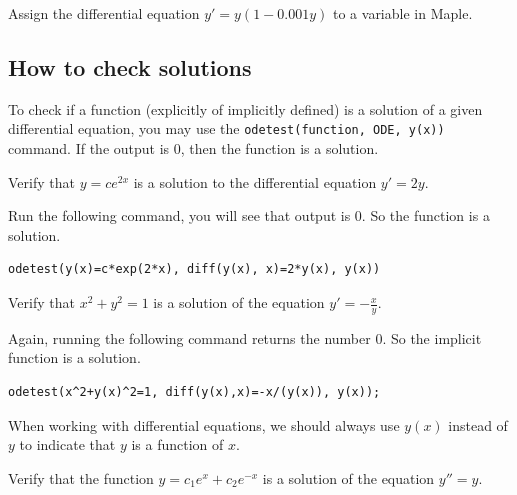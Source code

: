 \documentclass[
  12pt]{elegantbook}
\begin{document}
\begin{exercise}
Assign the differential equation \(y'=y(1-0.001y)\) to a variable in Maple.
\end{exercise}

\hypertarget{how-to-check-solutions}{%
\subsection{How to check solutions}\label{how-to-check-solutions}}

To check if a function (explicitly of implicitly defined) is a solution of a given differential equation, you may use the \texttt{odetest(function,\ ODE,\ y(x))} command. If the output is 0, then the function is a solution.

\begin{example}
Verify that \(y=ce^{2x}\) is a solution to the differential equation \(y'=2y\).
\end{example}

\begin{solution}

Run the following command, you will see that output is 0. So the function is a solution.

\begin{verbatim}
odetest(y(x)=c*exp(2*x), diff(y(x), x)=2*y(x), y(x))
\end{verbatim}

\end{solution}

\begin{example}
Verify that \(x^2+y^2=1\) is a solution of the equation \(y'=-\frac xy\).
\end{example}

\begin{solution}

Again, running the following command returns the number 0. So the implicit function is a solution.

\begin{verbatim}
odetest(x^2+y(x)^2=1, diff(y(x),x)=-x/(y(x)), y(x));
\end{verbatim}

\end{solution}

When working with differential equations, we should always use \(y(x)\) instead of \(y\) to indicate that \(y\) is a function of \(x\).

\begin{exercise}
Verify that the function \(y=c_1e^x+c_2e^{-x}\) is a solution of the equation \(y''=y\).
\end{exercise}
\end{document}
